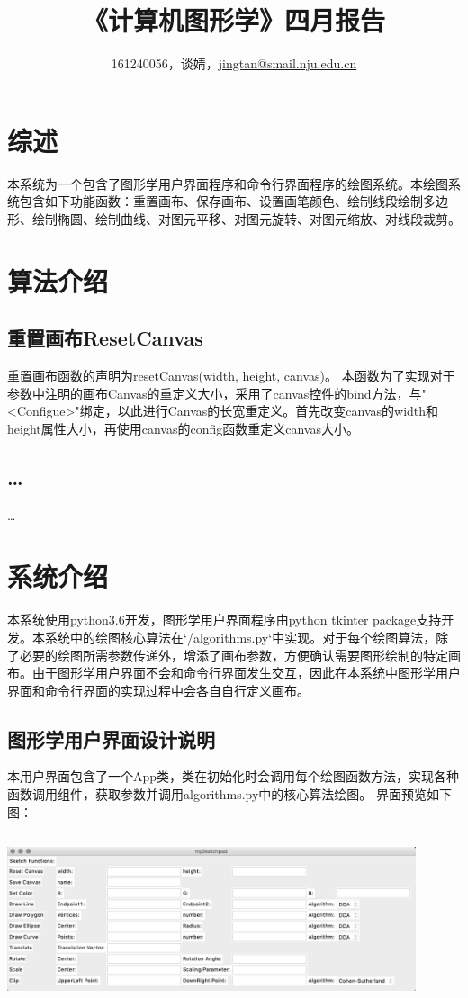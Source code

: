 \documentclass[a4paper,UTF8]{article}
\theoremstyle{definition}
\begin{document}
\title{\textbf{《计算机图形学》四月报告}}
\author{161240056，谈婧，\href{mailto:jingtan@smail.nju.edu.cn}{jingtan@smail.nju.edu.cn}}
\maketitle

\section{综述}
本系统为一个包含了图形学用户界面程序和命令行界面程序的绘图系统。本绘图系统包含如下功能函数：重置画布、保存画布、设置画笔颜色、绘制线段绘制多边形、绘制椭圆、绘制曲线、对图元平移、对图元旋转、对图元缩放、对线段裁剪。

\section{算法介绍}
\subsection{重置画布ResetCanvas}
重置画布函数的声明为resetCanvas(width, height, canvas)。
本函数为了实现对于参数中注明的画布Canvas的重定义大小，采用了canvas控件的bind方法，与"<Configue>"绑定，以此进行Canvas的长宽重定义。首先改变canvas的width和height属性大小，再使用canvas的config函数重定义canvas大小。
\subsection{\dots}
\dots
		
\section{系统介绍}
本系统使用python3.6开发，图形学用户界面程序由python tkinter package支持开发。本系统中的绘图核心算法在`/algorithms.py`中实现。对于每个绘图算法，除了必要的绘图所需参数传递外，增添了画布参数，方便确认需要图形绘制的特定画布。由于图形学用户界面不会和命令行界面发生交互，因此在本系统中图形学用户界面和命令行界面的实现过程中会各自自行定义画布。
\subsection{图形学用户界面设计说明}
本用户界面包含了一个App类，类在初始化时会调用每个绘图函数方法，实现各种函数调用组件，获取参数并调用algorithms.py中的核心算法绘图。
界面预览如下图：

\includegraphics[width=12cm, height=5cm]{picture/gui_1st.jpg}
\end{document}
